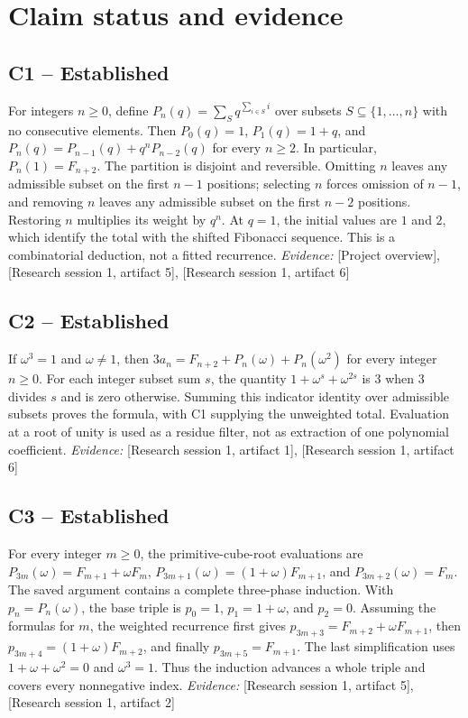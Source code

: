 \documentclass[11pt]{article}
\begin{document}
\section*{Claim status and evidence}
\begin{sloppypar}
\small
\subsection{C1 -- Established}
For integers $n\geq 0$, define $P_n(q)=\sum_S q^{\sum_{i\in S}i}$ over subsets $S\subseteq\{1,\ldots,n\}$ with no consecutive elements. Then $P_0(q)=1$, $P_1(q)=1+q$, and $P_n(q)=P_{n-1}(q)+q^nP_{n-2}(q)$ for every $n\geq 2$. In particular, $P_n(1)=F_{n+2}$.
The partition is disjoint and reversible. Omitting $n$ leaves any admissible subset on the first $n-1$ positions; selecting $n$ forces omission of $n-1$, and removing $n$ leaves any admissible subset on the first $n-2$ positions. Restoring $n$ multiplies its weight by $q^n$. At $q=1$, the initial values are $1$ and $2$, which identify the total with the shifted Fibonacci sequence. This is a combinatorial deduction, not a fitted recurrence.
\textit{Evidence: }[Project overview], [Research session 1, artifact 5], [Research session 1, artifact 6]
\subsection{C2 -- Established}
If $\omega^3=1$ and $\omega\ne 1$, then $3a_n=F_{n+2}+P_n(\omega)+P_n(\omega^2)$ for every integer $n\geq 0$.
For each integer subset sum $s$, the quantity $1+\omega^s+\omega^{2s}$ is $3$ when $3$ divides $s$ and is zero otherwise. Summing this indicator identity over admissible subsets proves the formula, with C1 supplying the unweighted total. Evaluation at a root of unity is used as a residue filter, not as extraction of one polynomial coefficient.
\textit{Evidence: }[Research session 1, artifact 1], [Research session 1, artifact 6]
\subsection{C3 -- Established}
For every integer $m\geq 0$, the primitive-cube-root evaluations are $P_{3m}(\omega)=F_{m+1}+\omega F_m$, $P_{3m+1}(\omega)=(1+\omega)F_{m+1}$, and $P_{3m+2}(\omega)=F_m$.
The saved argument contains a complete three-phase induction. With $p_n=P_n(\omega)$, the base triple is $p_0=1$, $p_1=1+\omega$, and $p_2=0$. Assuming the formulas for $m$, the weighted recurrence first gives $p_{3m+3}=F_{m+2}+\omega F_{m+1}$, then $p_{3m+4}=(1+\omega)F_{m+2}$, and finally $p_{3m+5}=F_{m+1}$. The last simplification uses $1+\omega+\omega^2=0$ and $\omega^3=1$. Thus the induction advances a whole triple and covers every nonnegative index.
\textit{Evidence: }[Research session 1, artifact 5], [Research session 1, artifact 2]

\end{sloppypar}
\end{document}
